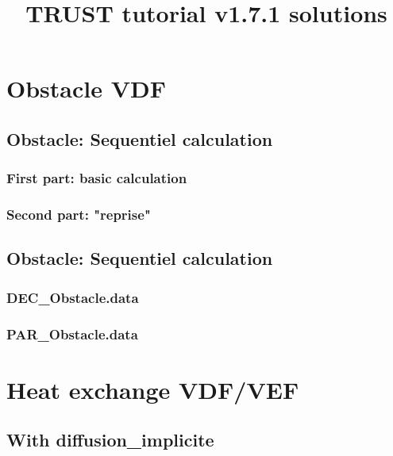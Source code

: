 \documentclass[english]{article}
\begin{document}
\title{TRUST tutorial v1.7.1 solutions}
\maketitle
\tableofcontents{}
\newpage

\section{Obstacle VDF}
\subsection{Obstacle: Sequentiel calculation}
\subsubsection{First part: basic calculation}

\subsubsection{Second part: "reprise"}


\subsection{Obstacle: Sequentiel calculation}
\subsubsection{DEC\_Obstacle.data}

\subsubsection{PAR\_Obstacle.data}



\section{Heat exchange VDF/VEF}
\subsection{With diffusion\_implicite}

\end{document}
